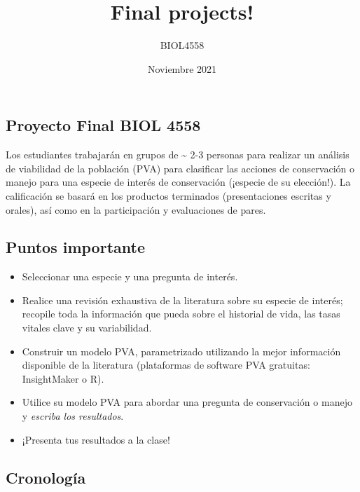 \documentclass[
]{article}
\title{Final projects!}
\author{BIOL4558}
\date{Noviembre 2021}
\begin{document}
\maketitle

{
\setcounter{tocdepth}{2}
\tableofcontents
}
\hypertarget{proyecto-final-biol-4558}{%
\subsection{Proyecto Final BIOL 4558}\label{proyecto-final-biol-4558}}

Los estudiantes trabajarán en grupos de \textasciitilde{} 2-3 personas
para realizar un análisis de viabilidad de la población (PVA) para
clasificar las acciones de conservación o manejo para una especie de
interés de conservación (¡especie de su elección!). La calificación se
basará en los productos terminados (presentaciones escritas y orales),
así como en la participación y evaluaciones de pares.

\hypertarget{puntos-importante}{%
\subsection{Puntos importante}\label{puntos-importante}}

\begin{itemize}
\item
  Seleccionar una especie y una pregunta de interés.
\item
  Realice una revisión exhaustiva de la literatura sobre su especie de
  interés; recopile toda la información que pueda sobre el historial de
  vida, las tasas vitales clave y su variabilidad.
\item
  Construir un modelo PVA, parametrizado utilizando la mejor información
  disponible de la literatura (plataformas de software PVA gratuitas:
  InsightMaker o R).
\item
  Utilice su modelo PVA para abordar una pregunta de conservación o
  manejo y \emph{escriba los resultados}.
\item
  ¡Presenta tus resultados a la clase!
\end{itemize}

\hypertarget{cronologuxeda}{%
\subsection{Cronología}\label{cronologuxeda}}
\end{document}
